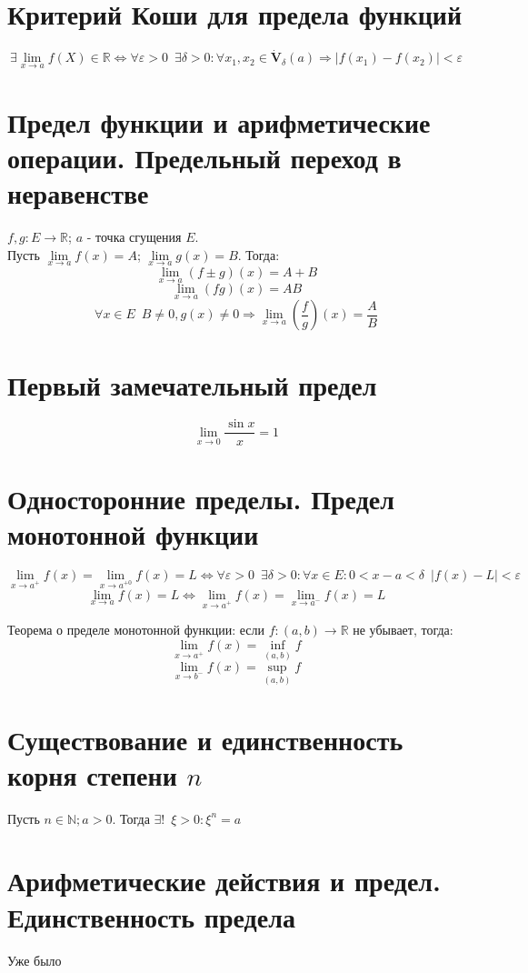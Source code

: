 \documentclass[11pt, a4paper]{article}
\def\R{\mathbb{R}}
\def\N{\mathbb{N}}
\def\sp{\, \, \,}
\def\lima{\lim \limits_{x \to a}}
\begin{document}
    \section{Критерий Коши для предела функций}
    $$\exists \lima f(X) \in \R \Leftrightarrow \forall \varepsilon > 0 \sp \exists \delta > 0: \forall x_1, x_2 \in \dot{\mathbf{V}}_{\delta}(a) \Rightarrow |f(x_1) - f(x_2)| < \varepsilon$$

    \section{Предел функции и арифметические операции. Предельный переход в неравенстве}
    $f,g : E \to \R$; $a$ - точка сгущения $E$.\\
    Пусть $\lima f(x) = A$; $\lima g(x) = B$. Тогда:
    $$\lima (f \pm g)(x) = A+B$$
    $$\lima (fg)(x) = AB$$
    $$\forall x \in E \sp B \neq 0, g(x) \neq 0 \Rightarrow \lima \left(\frac{f}{g}\right)(x) = \frac{A}{B}$$

    \section{Первый замечательный предел}
    $$\lim_{x \to 0} \frac{\sin x}{x} = 1$$

    \section{Односторонние пределы. Предел монотонной функции}
    $$\lim_{x \to a^+} f(x)= \lim_{x \to a^{+ 0}} f(x) = L \Leftrightarrow \forall \varepsilon > 0 \sp \exists \delta > 0 : \forall x \in E : 0 < x-a < \delta \sp |f(x) - L| < \varepsilon$$
    $$\lima f(x) = L \Leftrightarrow \lim_{x \to a^+} f(x) = \lim_{x \to a^-} f(x) = L$$

    Теорема о пределе монотонной функции: если $f : (a,b) \to \R$ не убывает, тогда:
    $$\lim_{x \to a^+} f(x) = \inf \limits_{(a,b)} f$$
    $$\lim_{x \to b^-} f(x) = \sup \limits_{(a,b)} f$$

    \section{Существование и единственность корня степени $n$}
    Пусть $n \in \N; a > 0$. Тогда $\exists ! \sp \xi > 0 : \xi ^n = a$

    \section{Арифметические действия и предел. Единственность предела}
    Уже было
\end{document}
